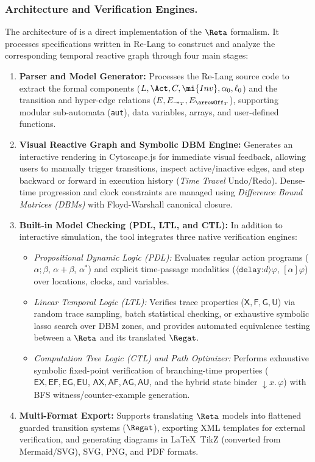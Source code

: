\subsubsection*{Architecture and Verification Engines.}
The architecture of \RTATool is a direct implementation of the $\Reta$ formalism. It processes specifications written in \textsf{Re-Lang} to construct and analyze the corresponding temporal reactive graph through four main stages:
\begin{enumerate}
    \item \textbf{Parser and Model Generator:} Processes the \textsf{Re-Lang} source code to extract the formal components ($L, \Act, C, \mi{Inv}, \alpha_0, \ell_0$) and the transition and hyper-edge relations ($E, E_{\twoheadrightarrow_T}, E_{\arrowOff_T}$), supporting modular sub-automata (\texttt{aut}), data variables, arrays, and user-defined functions.
    \item \textbf{Visual Reactive Graph and Symbolic DBM Engine:} Generates an interactive rendering in Cytoscape.js for immediate visual feedback, allowing users to manually trigger transitions, inspect active/inactive edges, and step backward or forward in execution history (\emph{Time Travel} Undo/Redo). Dense-time progression and clock constraints are managed using \emph{Difference Bound Matrices (DBMs)} with Floyd-Warshall canonical closure.
    \item \textbf{Built-in Model Checking (PDL, LTL, and CTL):} In addition to interactive simulation, the tool integrates three native verification engines:
    \begin{itemize}
        \item \emph{Propositional Dynamic Logic (PDL):} Evaluates regular action programs ($\alpha ; \beta$, $\alpha + \beta$, $\alpha^*$) and explicit time-passage modalities ($\langle \texttt{delay:}d \rangle \varphi$, $[\alpha]\varphi$) over locations, clocks, and variables.
        \item \emph{Linear Temporal Logic (LTL):} Verifies trace properties ($\mathsf{X}, \mathsf{F}, \mathsf{G}, \mathsf{U}$) via random trace sampling, batch statistical checking, or exhaustive symbolic lasso search over DBM zones, and provides automated equivalence testing between a $\Reta$ and its translated $\Regat$.
        \item \emph{Computation Tree Logic (CTL) and Path Optimizer:} Performs exhaustive symbolic fixed-point verification of branching-time properties ($\mathsf{EX}, \mathsf{EF}, \mathsf{EG}, \mathsf{EU}$, $\mathsf{AX}, \mathsf{AF}, \mathsf{AG}, \mathsf{AU}$, and the hybrid state binder ${\downarrow}x.\,\varphi$) with BFS witness/counter-example generation.
    \end{itemize}
    \item \textbf{Multi-Format Export:} Supports translating $\Reta$ models into flattened guarded transition systems ($\Regat$), exporting \Uppaal XML templates for external verification, and generating diagrams in \LaTeX\ TikZ (converted from Mermaid/SVG), SVG, PNG, and PDF formats.
\end{enumerate}

